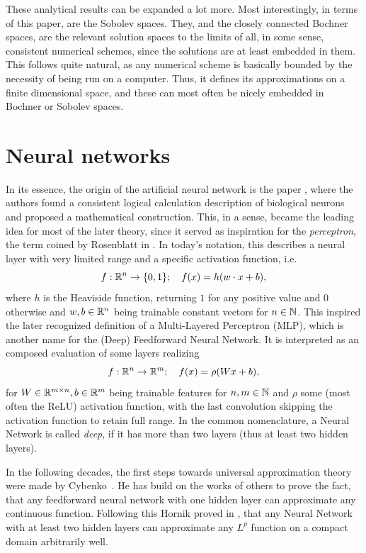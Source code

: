 These analytical results can be expanded a lot more. Most interestingly, in terms of this paper, are
the Sobolev spaces. They, and the closely connected Bochner spaces, are the relevant solution spaces
to the limits of all, in some sense, consistent numerical schemes, since the solutions are at least embedded in them.
This follows quite natural, as any numerical scheme is basically bounded by the necessity of being run on a computer.
Thus, it defines its approximations on a finite dimensional
space, and these can most often be nicely embedded in Bochner or Sobolev spaces.



\section{Neural networks}




In its essence, the origin of the artificial neural network is the paper \cite{mcculloch1943}, 
where the authors found a consistent logical calculation description of biological neurons and proposed a 
mathematical construction. This, in a sense, became the leading idea for most of the later theory,
since it served as inspiration for the \emph{perceptron}, the term coined by Rosenblatt in
\cite{rosenblatt1958}. In today's notation, this describes a neural layer with very limited
range and a specific activation function, i.e.
\begin{equation*}
    f: \mathbb{R}^n \to \{0, 1\}; \quad f(x) = h(w \cdot x + b),
\end{equation*}
where $h$ is the Heaviside function, returning $1$ for any positive value and $0$ otherwise and $w, b \in \mathbb{R}^n$ 
being trainable constant vectors for $n \in \mathbb{N}$. 
This inspired the later recognized definition of a Multi-Layered Perceptron (MLP), 
which is another name for the (Deep) Feedforward Neural Network. It is interpreted as an 
composed evaluation of some layers realizing
\begin{equation*}
    f: \mathbb{R}^n \to \mathbb{R}^m; \quad f(x) = \rho(W x + b),
\end{equation*}
for $W \in \mathbb{R}^{m \times n}, b \in \mathbb{R}^m$ being trainable features for $n, m \in \mathbb{N}$ 
and $\rho$ some (most often the ReLU) activation
function, with the last convolution skipping the activation function to retain full range. In the common
nomenclature, a Neural Network is called \emph{deep}, if it has more than two layers (thus at least two hidden layers).

In the following decades, the first steps towards universal approximation theory were made by
Cybenko~\cite{cybenko1989}. He has build on the works of others to prove the fact, that any feedforward 
neural network with one hidden layer can approximate any continuous function. Following this 
Hornik proved in \cite{hornik1991nn}, that any Neural Network with at least two hidden layers can approximate
any $L^p$ function on a compact domain arbitrarily well. 

